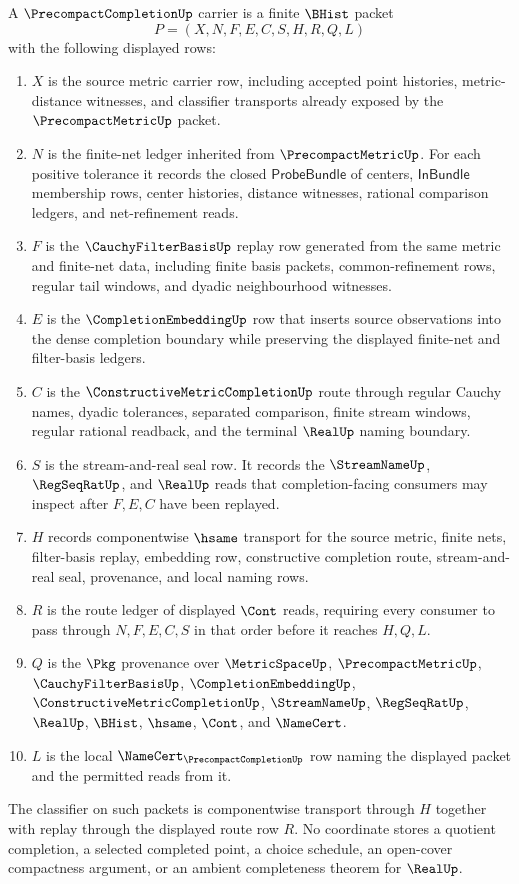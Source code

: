 \begin{definition}
\label{def:precompact-completion-carrier}
A $\PrecompactCompletionUp$ carrier is a finite $\BHist$ packet
$$
P=(X,N,F,E,C,S,H,R,Q,L)
$$
with the following displayed rows:
\begin{enumerate}
\item $X$ is the source metric carrier row, including accepted point histories, metric-distance witnesses, and classifier transports already exposed by the $\PrecompactMetricUp$ packet.
\item $N$ is the finite-net ledger inherited from $\PrecompactMetricUp$. For each positive tolerance it records the closed $\mathsf{ProbeBundle}$ of centers, $\mathsf{InBundle}$ membership rows, center histories, distance witnesses, rational comparison ledgers, and net-refinement reads.
\item $F$ is the $\CauchyFilterBasisUp$ replay row generated from the same metric and finite-net data, including finite basis packets, common-refinement rows, regular tail windows, and dyadic neighbourhood witnesses.
\item $E$ is the $\CompletionEmbeddingUp$ row that inserts source observations into the dense completion boundary while preserving the displayed finite-net and filter-basis ledgers.
\item $C$ is the $\ConstructiveMetricCompletionUp$ route through regular Cauchy names, dyadic tolerances, separated comparison, finite stream windows, regular rational readback, and the terminal $\RealUp$ naming boundary.
\item $S$ is the stream-and-real seal row. It records the $\StreamNameUp$, $\RegSeqRatUp$, and $\RealUp$ reads that completion-facing consumers may inspect after $F,E,C$ have been replayed.
\item $H$ records componentwise $\hsame$ transport for the source metric, finite nets, filter-basis replay, embedding row, constructive completion route, stream-and-real seal, provenance, and local naming rows.
\item $R$ is the route ledger of displayed $\Cont$ reads, requiring every consumer to pass through $N,F,E,C,S$ in that order before it reaches $H,Q,L$.
\item $Q$ is the $\Pkg$ provenance over $\MetricSpaceUp$, $\PrecompactMetricUp$, $\CauchyFilterBasisUp$, $\CompletionEmbeddingUp$, $\ConstructiveMetricCompletionUp$, $\StreamNameUp$, $\RegSeqRatUp$, $\RealUp$, $\BHist$, $\hsame$, $\Cont$, and $\NameCert$.
\item $L$ is the local $\NameCert_{\PrecompactCompletionUp}$ row naming the displayed packet and the permitted reads from it.
\end{enumerate}
The classifier on such packets is componentwise transport through $H$ together with replay through the displayed route row $R$. No coordinate stores a quotient completion, a selected completed point, a choice schedule, an open-cover compactness argument, or an ambient completeness theorem for $\RealUp$.
\end{definition}

